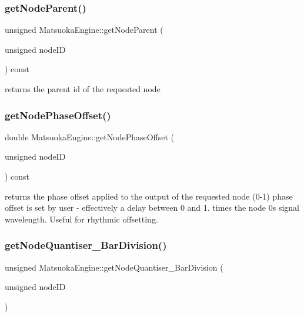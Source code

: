 \subsubsection{\texorpdfstring{get\+Node\+Parent()}{getNodeParent()}}
{\footnotesize\ttfamily unsigned Matsuoka\+Engine\+::get\+Node\+Parent (\begin{DoxyParamCaption}\item[{unsigned}]{node\+ID }\end{DoxyParamCaption}) const}



returns the parent id of the requested node 

\mbox{\label{classMatsuokaEngine_a201de701852d315d3eac20c749b19752}} 
\subsubsection{\texorpdfstring{get\+Node\+Phase\+Offset()}{getNodePhaseOffset()}}
{\footnotesize\ttfamily double Matsuoka\+Engine\+::get\+Node\+Phase\+Offset (\begin{DoxyParamCaption}\item[{unsigned}]{node\+ID }\end{DoxyParamCaption}) const}

returns the phase offset applied to the output of the requested node (0-\/1) phase offset is set by user -\/ effectively a delay between 0 and 1. times the node 0s signal wavelength. Useful for rhythmic offsetting. \mbox{\label{classMatsuokaEngine_af7edec268c651be3a45061cf9e90c123}} 
\subsubsection{\texorpdfstring{get\+Node\+Quantiser\+\_\+\+Bar\+Division()}{getNodeQuantiser\_BarDivision()}}
{\footnotesize\ttfamily unsigned Matsuoka\+Engine\+::get\+Node\+Quantiser\+\_\+\+Bar\+Division (\begin{DoxyParamCaption}\item[{unsigned}]{node\+ID }\end{DoxyParamCaption})}

